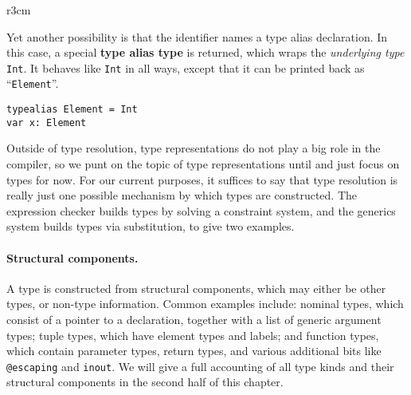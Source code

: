 \documentclass[../generics]{subfiles}
\begin{document}
\medskip

\begin{wrapfigure}[8]{r}{3cm}
\end{wrapfigure}

Yet another possibility is that the identifier names a type alias declaration. In this case, a special \textbf{type alias type} is returned, which wraps the \emph{underlying type} \texttt{Int}. It behaves like \texttt{Int} in all ways, except that it can be printed back as ``\texttt{Element}''.

\medskip
\noindent
\begin{minipage}{29em}
\begin{Verbatim}
typealias Element = Int
var x: Element
\end{Verbatim}
\end{minipage}
\medskip

Outside of type resolution, type representations do not play a big role in the compiler, so we punt on the topic of type representations until  and just focus on types for now. For our current purposes, it suffices to say that type resolution is really just one possible mechanism by which types are constructed. The expression checker builds types by solving a constraint system, and the generics system builds types via substitution, to give two examples.

\paragraph{Structural components.} A type is constructed from structural components, which may either be other types, or non-type information. Common examples include: nominal types, which consist of a pointer to a declaration, together with a list of generic argument types; tuple types, which have element types and labels; and function types, which contain parameter types, return types, and various additional bits like \texttt{@escaping} and \texttt{inout}.  We will give a full accounting of all type kinds and their structural components in the second half of this chapter.
\end{document}

